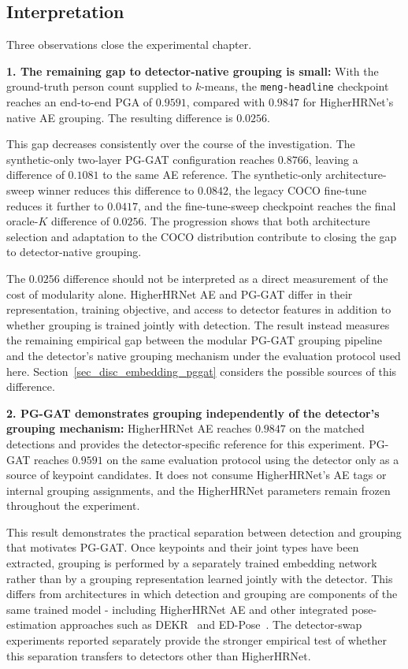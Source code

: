 \subsection{Interpretation}
\label{sec_res_e2e_discussion}

Three observations close the experimental chapter.

\textbf{1. The remaining gap to detector-native grouping is small:}
With the ground-truth person count supplied to $k$-means,
the \texttt{meng-headline} checkpoint reaches an end-to-end PGA of
$0.9591$,
compared with $0.9847$ for HigherHRNet's native AE grouping.
The resulting difference is $0.0256$.

This gap decreases consistently over the course of the investigation.
The synthetic-only two-layer PG-GAT configuration reaches $0.8766$,
leaving a difference of $0.1081$ to the same AE reference.
The synthetic-only architecture-sweep winner reduces this difference
to $0.0842$,
the legacy COCO fine-tune reduces it further to $0.0417$,
and the fine-tune-sweep checkpoint reaches the final oracle-$K$
difference of $0.0256$.
The progression shows that both architecture selection and adaptation
to the COCO distribution contribute to closing the gap to detector-native
grouping.

The $0.0256$ difference should not be interpreted as a direct
measurement of the cost of modularity alone.
HigherHRNet AE and PG-GAT differ in their representation,
training objective,
and access to detector features in addition to whether grouping is
trained jointly with detection.
The result instead measures the remaining empirical gap between
the modular PG-GAT grouping pipeline and the detector's native grouping
mechanism under the evaluation protocol used here.
Section~\ref{sec_disc_embedding_pggat} considers the possible sources
of this difference.

\textbf{2. PG-GAT demonstrates grouping independently of the
detector's grouping mechanism:}
HigherHRNet AE reaches $0.9847$ on the matched detections and provides
the detector-specific reference for this experiment.
PG-GAT reaches $0.9591$ on the same evaluation protocol using
the detector only as a source of keypoint candidates.
It does not consume HigherHRNet's AE tags or internal grouping
assignments,
and the HigherHRNet parameters remain frozen throughout the experiment.

This result demonstrates the practical separation between detection
and grouping that motivates PG-GAT.
Once keypoints and their joint types have been extracted,
grouping is performed by a separately trained embedding network
rather than by a grouping representation learned jointly with the detector.
This differs from architectures in which detection and grouping are
components of the same trained model -
including HigherHRNet AE and other integrated pose-estimation
approaches such as DEKR~\cite{geng2021dekr} and
ED-Pose~\cite{yang2023edpose}.
The detector-swap experiments reported separately provide the stronger
empirical test of whether this separation transfers to detectors other
than HigherHRNet.

